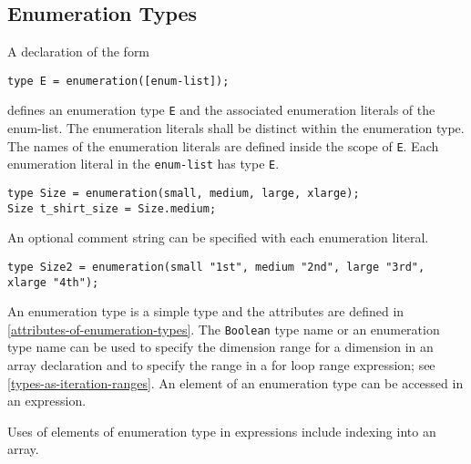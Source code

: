 \subsection{Enumeration Types}\label{enumeration-types}

A declaration of the form
\begin{lstlisting}[language=modelica]
type E = enumeration([enum-list]);
\end{lstlisting}
defines an enumeration type \lstinline!E! and the associated enumeration literals of
the enum-list. The enumeration literals shall be distinct within the
enumeration type. The names of the enumeration literals are defined
inside the scope of \lstinline!E!. Each enumeration literal in the \lstinline!enum-list! has
type \lstinline!E!.

\begin{example}
\begin{lstlisting}[language=modelica]
type Size = enumeration(small, medium, large, xlarge);
Size t_shirt_size = Size.medium;
\end{lstlisting}
\end{example}

An optional comment string can be specified with each enumeration literal.

\begin{example}
\begin{lstlisting}[language=modelica]
type Size2 = enumeration(small "1st", medium "2nd", large "3rd", xlarge "4th");
\end{lstlisting}
\end{example}

An enumeration type is a simple type and the attributes are defined in
\cref{attributes-of-enumeration-types}. The \lstinline!Boolean! type name or an enumeration type name can
be used to specify the dimension range for a dimension in an array
declaration and to specify the range in a for loop range expression; see
\cref{types-as-iteration-ranges}. An element of an enumeration type can be accessed in
an expression.

\begin{nonnormative}
Uses of elements of enumeration type in expressions include indexing into an array.
\end{nonnormative}

